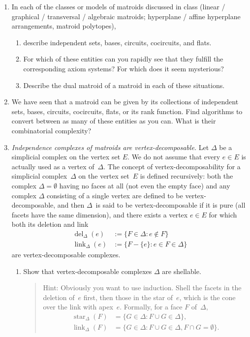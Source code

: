 \documentclass[11pt]{amsart}
\DeclareMathOperator{\del}{del}
\DeclareMathOperator{\link}{link}
\DeclareMathOperator{\thestar}{star}
\newcommand{\defn}[1]{{\color{blue}#1}}
\begin{document}
\begin{enumerate}
  \bigskip
\item
  In each of the classes or models of matroids discussed in class (linear / graphical / transversal / algebraic matroids; hyperplane / affine hyperplane arrangements, matroid polytopes),
  \begin{enumerate}
  \item
    describe independent sets, bases, circuits, cocircuits, and
    flats.
  \item
    For which of these entities can you rapidly see that they
    fulfill the corresponding axiom systems?  For which does it seem
    mysterious?
  \item
    Describe the dual matroid of a matroid in each of
    these situations.
  \end{enumerate}

  \bigskip
\item
  We have seen that a matroid can be given by its collections of independent sets, bases, circuits, cocircuits, flats, or its rank function.
  Find algorithms to convert between as many of these entities as you can.
  What is their combinatorial complexity?
 
  \bigskip

\item
  \emph{Independence complexes of matroids are vertex-decomposable.}
  Let $\Delta$ be a simplicial complex on the vertex set $E$.
  We do not assume that every $e \in E$ is actually used as a vertex of~$\Delta$.
  The concept of vertex-decomposability for a simplicial complex~$\Delta$ on the vertex set~$E$ is defined recursively:
  both the complex $\Delta = \emptyset$ having no faces at all (not even the empty face)
  and any complex $\Delta$ consisting of a single vertex are defined to be \defn{vertex-decomposable},
  and then $\Delta$~is said to be \defn{vertex-decomposable} if it is pure (all facets have the same dimension),
  and there exists a vertex $e \in E$ for which both its deletion and link
  \begin{align*}
    \del_\Delta (e) &:= \{F \in \Delta : e \notin F \}
    \\
    \link_\Delta (e) &:= \{F - \{e\} : e \in F \in \Delta\}
  \end{align*}
  are vertex-decomposable complexes.

  \begin{enumerate}
  \item
    Show that vertex-decomposable complexes $\Delta$ are shellable.

    \begin{quote}
    \footnotesize\color{green!30!black} 
    Hint: Obviously you want to use induction.
    Shell the facets in the deletion of~$e$ first,
    then those in the star of~$e$, which is the cone over the link with apex~$e$.
    Formally, for a face $F$ of~$\Delta$,
    \begin{align*}
      \thestar_\Delta(F) &= \{ G\in\Delta: F\cup G\in\Delta\},
      \\
      \link_\Delta(F) &= \{ G\in\Delta: F\cup G\in\Delta, F\cap G=\emptyset\}.
    \end{align*}
  \end{quote}


\end{enumerate}
\end{enumerate}
\end{document}
